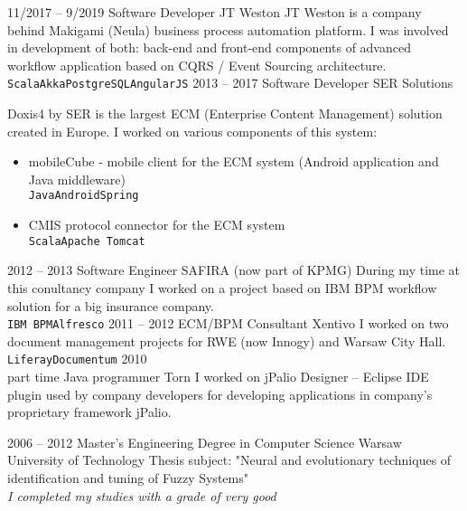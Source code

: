 \documentclass[9pt]{developercv}
\begin{document}
\begin{entrylist}
	\entry
		{11/2017 -- 9/2019}
		{Software Developer}
		{JT Weston}
		{JT Weston is a company behind Makigami (Neula) business process automation platform. I was involved in development of both: back-end and front-end components of advanced workflow application based on CQRS / Event Sourcing architecture.\\
		\texttt{Scala}\slashsep\texttt{Akka}\slashsep\texttt{PostgreSQL}\slashsep\texttt{AngularJS}}
	\entry
		{2013 -- 2017}
		{Software Developer}
		{SER Solutions}
		{Doxis4 by SER is the largest ECM (Enterprise Content Management) solution created in Europe. I worked on various components of this system:
		\begin{itemize}
			\item mobileCube - mobile client for the ECM system (Android application and Java middleware) \\ \texttt{Java}\slashsep\texttt{Android}\slashsep\texttt{Spring}
			\item CMIS protocol connector for the ECM system \\ \texttt{Scala}\slashsep\texttt{Apache Tomcat}
		\end{itemize}}
	\entry
		{2012 -- 2013}
		{Software Engineer}
		{SAFIRA (now part of KPMG)}
		{During my time at this conultancy company I worked on a project based on IBM BPM workflow solution for a big insurance company. \\ \texttt{IBM BPM}\slashsep\texttt{Alfresco}}
	\entry
		{2011 -- 2012}
		{ECM/BPM Consultant}
		{Xentivo}
		{I worked on two document management projects for RWE (now Innogy) and Warsaw City Hall. \\ \texttt{Liferay}\slashsep\texttt{Documentum}}
	\entry
		{2010 \\\footnotesize{part time}}
		{Java programmer}
		{Torn}
		{I worked on jPalio Designer -- Eclipse IDE plugin used by company developers for developing applications in company's proprietary framework jPalio.}
			
\end{entrylist}



\begin{entrylist}
	\entry
		{2006 -- 2012}
		{Master's Engineering Degree in Computer Science}
		{Warsaw University of Technology}
		{Thesis subject: "Neural and evolutionary techniques of identification and tuning of Fuzzy Systems" \\ \textit{I completed my studies with a grade of very good}}
\end{entrylist}
\end{document}

